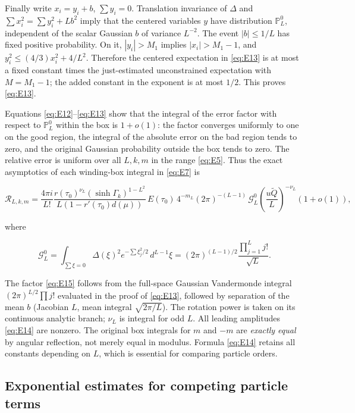 \documentclass[11pt,a4paper]{article}
\numberwithin{equation}{section}
\theoremstyle{plain}
\theoremstyle{definition}
\begin{document}
Finally write $x_i=y_i+b$, $\sum y_i=0$. Translation invariance of $\Delta$ and $\sum x_i^2=\sum y_i^2+Lb^2$ imply that the centered variables $y$ have distribution $\mathbb P_L^0$, independent of the scalar Gaussian $b$ of variance $L^{-2}$. The event $|b|\le1/L$ has fixed positive probability. On it, $|y_i|>M_1$ implies $|x_i|>M_1-1$, and $y_i^2\le(4/3)x_i^2+4/L^2$. Therefore the centered expectation in \eqref{eq:E13} is at most a fixed constant times the just-estimated unconstrained expectation with $M=M_1-1$; the added constant in the exponent is at most $1/2$. This proves \eqref{eq:E13}.

Equations \eqref{eq:E12}--\eqref{eq:E13} show that the integral of the error factor with respect to \(\mathbb P_L^0\) within the box is \(1+o(1)\): the factor converges uniformly to one on the good region, the integral of the absolute error on the bad region tends to zero, and the original Gaussian probability outside the box tends to zero. The relative error is uniform over all \(L,k,m\) in the range \eqref{eq:E5}. Thus the exact asymptotics of each winding-box integral in \eqref{eq:E7} is

\begin{equation}
\mathcal R_{L,k,m}=\frac{4\pi i}{L!}\frac{r(\tau_0)^{\nu_L}(\sinh\Gamma_k)^{1-L^2}}{L(1-r'(\tau_0)d(\mu))}\, E(\tau_0)\,4^{-m_L}(2\pi)^{-(L-1)}\,\mathcal G_L^0\left(\frac{u\widetilde Q}{L}\right)^{-\nu_L}(1+o(1)),
\label{eq:E14}
\end{equation}

where

\begin{equation}
\mathcal G_L^0=\int_{\sum\xi=0}\Delta(\xi)^2 e^{-\sum\xi_j^2/2}\,d^{L-1}\xi=(2\pi)^{(L-1)/2}\frac{\prod_{j=1}^L j!}{\sqrt L}.
\label{eq:E15}
\end{equation}

The factor \eqref{eq:E15} follows from the full-space Gaussian Vandermonde integral \((2\pi)^{L/2}\prod j!\) evaluated in the proof of \eqref{eq:E13}, followed by separation of the mean \(b\) (Jacobian \(L\), mean integral \(\sqrt{2\pi/L}\)). The rotation power is taken on its continuous analytic branch; \(\nu_L\) is integral for odd \(L\). All leading amplitudes \eqref{eq:E14} are nonzero. The original box integrals for \(m\) and \(-m\) are \emph{exactly equal} by angular reflection, not merely equal in modulus. Formula \eqref{eq:E14} retains all constants depending on \(L\), which is essential for comparing particle orders.

\subsection{Exponential estimates for competing particle terms}\label{sec:compare}
\end{document}
